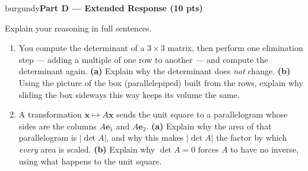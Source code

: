 \documentclass[10pt]{article}
\newcommand{\xx}{\mathbf{x}}
\newcommand{\ee}{\mathbf{e}}
\newcommand{\parthead}[1]{%
  \vspace{6pt}\noindent
  \begin{headlinebox}{burgundy}{\color{white}\bfseries #1}\end{headlinebox}%
  \vspace{4pt}}
\begin{document}
\parthead{Part D --- Extended Response (10 pts)}
Explain your reasoning in full sentences.

\begin{enumerate}[leftmargin=1.9em, itemsep=16pt]
  \item You compute the determinant of a $3\times3$ matrix, then perform one elimination step ---
        adding a multiple of one row to another --- and compute the determinant again.
        \textbf{(a)} Explain why the determinant does \emph{not} change. \textbf{(b)} Using the picture of the
        box (parallelepiped) built from the rows, explain why sliding the box sideways this way keeps its
        volume the same.
        \vspace{3.0cm}
  \item A transformation $\xx\mapsto A\xx$ sends the unit square to a parallelogram whose sides are the
        columns $A\ee_1$ and $A\ee_2$. \textbf{(a)} Explain why the area of that parallelogram is $|\det A|$,
        and why this makes $|\det A|$ the factor by which \emph{every} area is scaled. \textbf{(b)} Explain
        why $\det A=0$ forces $A$ to have no inverse, using what happens to the unit square.
        \vspace{2.8cm}
\end{enumerate}
\end{document}
